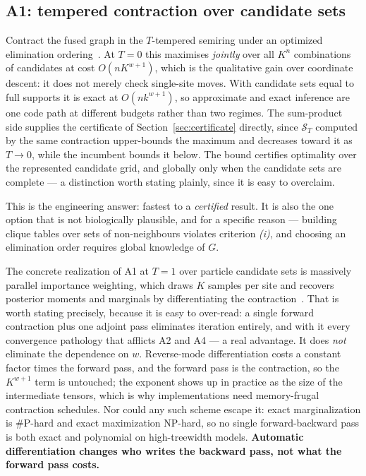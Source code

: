 \subsection{A1: tempered contraction over candidate sets}

Contract the fused graph in the $T$-tempered semiring under an optimized elimination ordering~\citep{Dechter1999}. At $T = 0$ this maximises \emph{jointly} over all $K^n$ combinations of candidates at cost $O(n K^{w+1})$, which is the qualitative gain over coordinate descent: it does not merely check single-site moves. With candidate sets equal to full supports it is exact at $O(n k^{w+1})$, so approximate and exact inference are one code path at different budgets rather than two regimes. The sum-product side supplies the certificate of Section~\ref{sec:certificate} directly, since $\mathcal{S}_T$ computed by the same contraction upper-bounds the maximum and decreases toward it as $T \rightarrow 0$, while the incumbent bounds it below. The bound certifies optimality over the represented candidate grid, and globally only when the candidate sets are complete --- a distinction worth stating plainly, since it is easy to overclaim.

This is the engineering answer: fastest to a \emph{certified} result. It is also the one option that is not biologically plausible, and for a specific reason --- building clique tables over sets of non-neighbours violates criterion \emph{(i)}, and choosing an elimination order requires global knowledge of $G$.

The concrete realization of A1 at $T = 1$ over particle candidate sets is massively parallel importance weighting, which draws $K$ samples per site and recovers posterior moments and marginals by differentiating the contraction~\citep{Bowyer2024}. That is worth stating precisely, because it is easy to over-read: a single forward contraction plus one adjoint pass eliminates iteration entirely, and with it every convergence pathology that afflicts A2 and A4 --- a real advantage. It does \emph{not} eliminate the dependence on $w$. Reverse-mode differentiation costs a constant factor times the forward pass, and the forward pass is the contraction, so the $K^{w+1}$ term is untouched; the exponent shows up in practice as the size of the intermediate tensors, which is why implementations need memory-frugal contraction schedules. Nor could any such scheme escape it: exact marginalization is \#P-hard and exact maximization NP-hard, so no single forward-backward pass is both exact and polynomial on high-treewidth models. \textbf{Automatic differentiation changes who writes the backward pass, not what the forward pass costs.}

